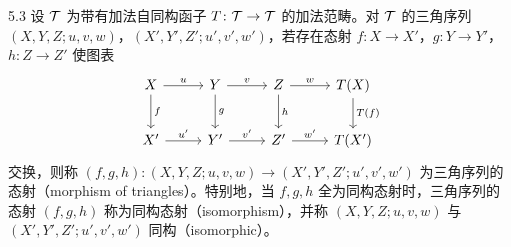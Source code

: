 
\begin{definition}{5.3}
设 $\mathcal{T}$ 为带有加法自同构函子 $T\colon\mathcal{T}\to\mathcal{T}$ 的加法范畴。对 $\mathcal{T}$ 的三角序列 $(X,Y,Z;u,v,w)$，$(X',Y',Z';u',v',w')$，若存在态射 $f\colon X\to X'$，$g\colon Y\to Y'$，$h\colon Z\to Z'$ 使图表
\[
\begin{tikzcd}[row sep=2.2em, column sep=2.6em]
X \arrow[r,"u"] \arrow[d,"f"] & Y \arrow[r,"v"] \arrow[d,"g"] & Z \arrow[r,"w"] \arrow[d,"h"] & T(X) \arrow[d,"T(f)"] \\
X' \arrow[r,"u'"] & Y' \arrow[r,"v'"] & Z' \arrow[r,"w'"] & T(X')
\end{tikzcd}
\]
交换，则称 $(f,g,h)\colon(X,Y,Z;u,v,w)\to(X',Y',Z';u',v',w')$ 为三角序列的态射（morphism of triangles）。特别地，当 $f,g,h$ 全为同构态射时，三角序列的态射 $(f,g,h)$ 称为同构态射（isomorphism），并称 $(X,Y,Z;u,v,w)$ 与 $(X',Y',Z';u',v',w')$ 同构（isomorphic）。
\end{definition}

